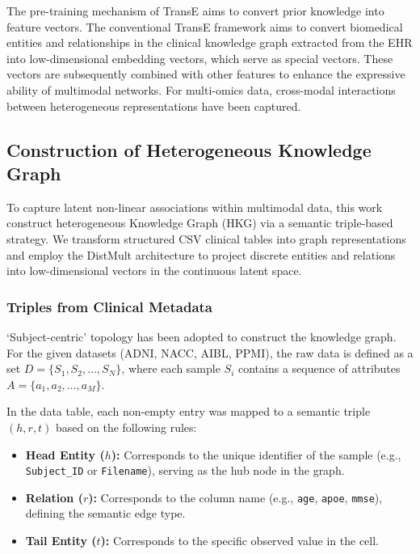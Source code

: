 \documentclass[lettersize,journal]{IEEEtran}
\begin{document}
    The pre-training mechanism of TransE aims to convert prior knowledge into feature vectors. The conventional TransE framework aims to convert biomedical entities and relationships in the clinical knowledge graph extracted from the EHR into low-dimensional embedding vectors, which serve as special vectors. These vectors are subsequently combined with other features to enhance the expressive ability of multimodal networks. For multi-omics data, cross-modal interactions between heterogeneous representations have been captured.
    


\subsection{Construction of Heterogeneous Knowledge Graph}

    To capture latent non-linear associations within multimodal data, this work construct heterogeneous Knowledge Graph (HKG) via a semantic triple-based strategy. We transform structured CSV clinical tables into graph representations and employ the DistMult architecture to project discrete entities and relations into low-dimensional vectors in the continuous latent space.

    \subsubsection{Triples from Clinical Metadata}
    
    `Subject-centric' topology has been adopted to construct the knowledge graph. For the given datasets (ADNI, NACC, AIBL, PPMI), the raw data is defined as a set $D = \{S_1, S_2, \dots, S_N\}$, where each sample $S_i$ contains a sequence of attributes $A = \{a_1, a_2, \dots, a_M\}$.

    In the data table, each non-empty entry was mapped to a semantic triple $(h, r, t)$ based on the following rules:
    
    \begin{itemize}
        \item \textbf{Head Entity ($h$):} Corresponds to the unique identifier of the sample (e.g., \texttt{Subject\_ID} or \texttt{Filename}), serving as the hub node in the graph.
        \item \textbf{Relation ($r$):} Corresponds to the column name (e.g., \texttt{age}, \texttt{apoe}, \texttt{mmse}), defining the semantic edge type.
        \item \textbf{Tail Entity ($t$):} Corresponds to the specific observed value in the cell.
    \end{itemize}
\end{document}
